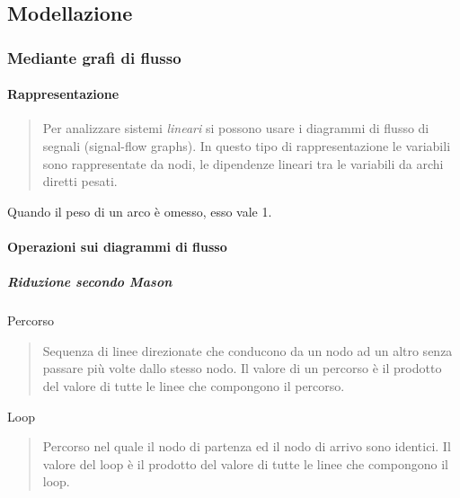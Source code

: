 \documentclass[11pt]{article}
\begin{document}
    \hypertarget{modellazione}{%
\subsection{Modellazione}\label{modellazione}}

\hypertarget{mediante-grafi-di-flusso}{%
\subsubsection{Mediante grafi di
flusso}\label{mediante-grafi-di-flusso}}

\hypertarget{rappresentazione}{%
\paragraph{Rappresentazione}\label{rappresentazione}}

\begin{quote}
Per analizzare sistemi \emph{lineari} si possono usare i diagrammi di
flusso di segnali (signal-flow graphs). In questo tipo di
rappresentazione le variabili sono rappresentate da nodi, le dipendenze
lineari tra le variabili da archi diretti pesati.
\end{quote}

Quando il peso di un arco è omesso, esso vale 1.

    \hypertarget{operazioni-sui-diagrammi-di-flusso}{%
\paragraph{Operazioni sui diagrammi di
flusso}\label{operazioni-sui-diagrammi-di-flusso}}

\hypertarget{riduzione-secondo-mason}{%
\subparagraph{Riduzione secondo Mason}\label{riduzione-secondo-mason}}

Percorso

\begin{quote}
Sequenza di linee direzionate che conducono da un nodo ad un altro senza
passare più volte dallo stesso nodo. Il valore di un percorso è il
prodotto del valore di tutte le linee che compongono il percorso.
\end{quote}

    Loop

\begin{quote}
Percorso nel quale il nodo di partenza ed il nodo di arrivo sono
identici. Il valore del loop è il prodotto del valore di tutte le linee
che compongono il loop.
\end{quote}
\end{document}
